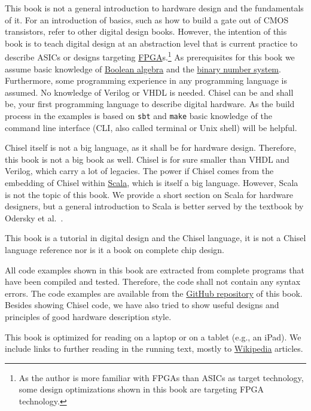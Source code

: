 \documentclass[%
    10pt, %
    headinclude, footexclude,
    openright, %
    notitlepage,
    cleardoubleempty,
    headsepline,
    pointlessnumbers,
    bibtotoc, idxtotoc,
    ]{scrbook}
\newcommand{\code}[1]{{\small{\texttt{#1}}}}
\newcommand{\myref}[2]{\href{#1}{#2}}
\begin{document}
This book is not a general introduction to hardware design and the fundamentals of it.
For an introduction of basics, such as how to build a gate out of CMOS transistors,
refer to other digital design books.
However, the intention of this book is to teach digital design at an abstraction level that is
current practice to describe ASICs or designs targeting
\myref{https://en.wikipedia.org/wiki/Field-programmable_gate_array}{FPGA}s.\footnote{As the author is more familiar with FPGAs
than ASICs as target technology, some design optimizations shown in this book are
targeting FPGA technology.}
As prerequisites for this book we assume basic knowledge of
\myref{https://en.wikipedia.org/wiki/Boolean_algebra}{Boolean algebra} and the
\myref{https://en.wikipedia.org/wiki/Binary_number}{binary number system}.
Furthermore, some programming experience in any programming language
is assumed. No knowledge of Verilog or VHDL is needed.
Chisel can be and shall be, your first programming language to describe digital hardware.
As the build process in the examples is based on \code{sbt} and \code{make}
basic knowledge of the command line interface (CLI, also called terminal or
Unix shell) will be helpful.

Chisel itself is not a big language, as it shall be for hardware design.
Therefore, this book is not a big book as well.
Chisel is for sure smaller than VHDL and Verilog, which carry a lot of legacies.
The power if Chisel comes from the embedding of Chisel within
\myref{https://www.scala-lang.org/}{Scala}, which is itself a big language.
However, Scala is not the topic
of this book. We provide a short section on Scala for hardware designers,
but a general introduction to Scala is better served by the textbook by
Odersky et al.~\cite{Scala}.

This book is a tutorial in digital design and the Chisel language, it is not
a Chisel language reference nor is it a book on complete chip design.


All code examples shown in this book are extracted from complete programs
that have been compiled and tested. Therefore, the code shall not contain
any syntax errors. The code examples are available from the
\myref{https://github.com/schoeberl/chisel-book}{GitHub repository}
of this book.
Besides showing Chisel code, we have also tried to show useful designs and
principles of good hardware description style.

This book is optimized for reading on a laptop or on a tablet (e.g., an iPad).
We include links to further reading in the running text, mostly to
\myref{https://en.wikipedia.org/}{Wikipedia} articles.
\end{document}

